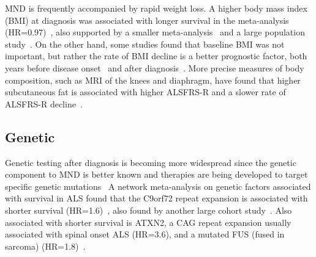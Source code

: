 MND is frequently accompanied by rapid weight loss.
A higher body mass index (BMI) at diagnosis was associated with longer survival in the meta-analysis (HR=0.97)~\cite{suPredictorsSurvivalPatients2021}, also supported by a smaller meta-analysis~\cite{dardiotisBodyMassIndex2018} and a large population study~\cite{gaoEpidemiologyFactorsPredicting2021}.
On the other hand, some studies found that baseline BMI was not important, but rather the rate of BMI decline is a better prognostic factor, both years before disease onset~\cite{goutmanBodyMassIndex2023} and after diagnosis~\cite{jawaidDecreaseBodyMass2010}.
More precise measures of body composition, such as MRI of the knees and diaphragm, have found that higher subcutaneous fat is associated with higher ALSFRS-R and a slower rate of ALSFRS-R decline~\cite{lindauerAdiposeTissueDistribution2013}.



\subsection{Genetic}

Genetic testing after diagnosis is becoming more widespread since the genetic component to MND is better known and therapies are being developed to target specific genetic mutations~\cite{efnstaskforceondiagnosisandmanagementofamyotrophiclateralsclerosis:EFNSGuidelinesClinical2012}
A network meta-analysis on genetic factors associated with survival in ALS found that the C9orf72 repeat expansion is associated with shorter survival (HR=1.6)~\cite{suGeneticFactorsSurvival2022}, also found by another large cohort study~\cite{chioAssociationCopresencePathogenic2023}.
Also associated with shorter survival is ATXN2, a CAG repeat expansion usually associated with spinal onset ALS (HR=3.6), and a mutated FUS (fused in sarcoma) (HR=1.8)~\cite{suGeneticFactorsSurvival2022}.


